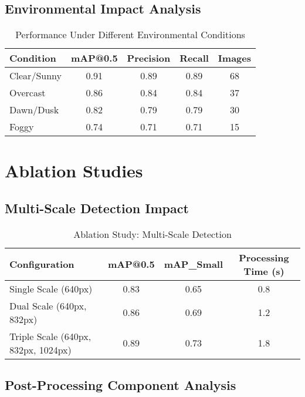 \documentclass[12pt,a4paper]{report}
\begin{document}
\subsection{Environmental Impact Analysis}

\begin{table}[H]
\centering
\caption{Performance Under Different Environmental Conditions}
\label{tab:environmental_performance}
\begin{tabular}{@{}lcccc@{}}
\toprule
Condition & mAP@0.5 & Precision & Recall & Images \\
\midrule
Clear/Sunny & 0.91 & 0.89 & 0.89 & 68 \\
Overcast & 0.86 & 0.84 & 0.84 & 37 \\
Dawn/Dusk & 0.82 & 0.79 & 0.79 & 30 \\
Foggy & 0.74 & 0.71 & 0.71 & 15 \\
\bottomrule
\end{tabular}
\end{table}

\section{Ablation Studies}

\subsection{Multi-Scale Detection Impact}

\begin{table}[H]
\centering
\caption{Ablation Study: Multi-Scale Detection}
\label{tab:multiscale_ablation}
\begin{tabular}{@{}lccc@{}}
\toprule
Configuration & mAP@0.5 & mAP\_Small & Processing Time (s) \\
\midrule
Single Scale (640px) & 0.83 & 0.65 & 0.8 \\
Dual Scale (640px, 832px) & 0.86 & 0.69 & 1.2 \\
Triple Scale (640px, 832px, 1024px) & 0.89 & 0.73 & 1.8 \\
\bottomrule
\end{tabular}
\end{table}

\subsection{Post-Processing Component Analysis}
\end{document}
